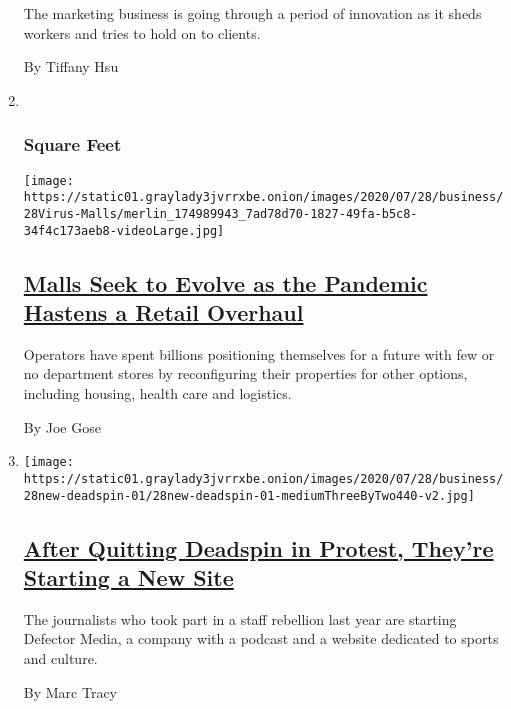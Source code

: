 \begin{enumerate}
  The marketing business is going through a period of innovation as it
  sheds workers and tries to hold on to clients.

  By Tiffany Hsu
\item ~
  \hypertarget{square-feet}{%
  \subsubsection{Square Feet}\label{square-feet}}

  \texttt{[image: https://static01.graylady3jvrrxbe.onion/images/2020/07/28/business/28Virus-Malls/merlin\_174989943\_7ad78d70-1827-49fa-b5c8-34f4c173aeb8-videoLarge.jpg]}

  \hypertarget{malls-seek-to-evolve-as-the-pandemic-hastens-a-retail-overhaul}{%
  \subsection{\texorpdfstring{\href{/2020/07/28/business/malls-coronavirus.html}{Malls
  Seek to Evolve as the Pandemic Hastens a Retail
  Overhaul}}{Malls Seek to Evolve as the Pandemic Hastens a Retail Overhaul}}\label{malls-seek-to-evolve-as-the-pandemic-hastens-a-retail-overhaul}}

  Operators have spent billions positioning themselves for a future with
  few or no department stores by reconfiguring their properties for
  other options, including housing, health care and logistics.

  By Joe Gose
\item
  \texttt{[image: https://static01.graylady3jvrrxbe.onion/images/2020/07/28/business/28new-deadspin-01/28new-deadspin-01-mediumThreeByTwo440-v2.jpg]}

  \hypertarget{after-quitting-deadspin-in-protest-theyre-starting-a-new-site}{%
  \subsection{\texorpdfstring{\href{/2020/07/28/business/media/deadspin-staffers-start-defector.html}{After
  Quitting Deadspin in Protest, They're Starting a New
  Site}}{After Quitting Deadspin in Protest, They're Starting a New Site}}\label{after-quitting-deadspin-in-protest-theyre-starting-a-new-site}}

  The journalists who took part in a staff rebellion last year are
  starting Defector Media, a company with a podcast and a website
  dedicated to sports and culture.

  By Marc Tracy
\end{enumerate}

